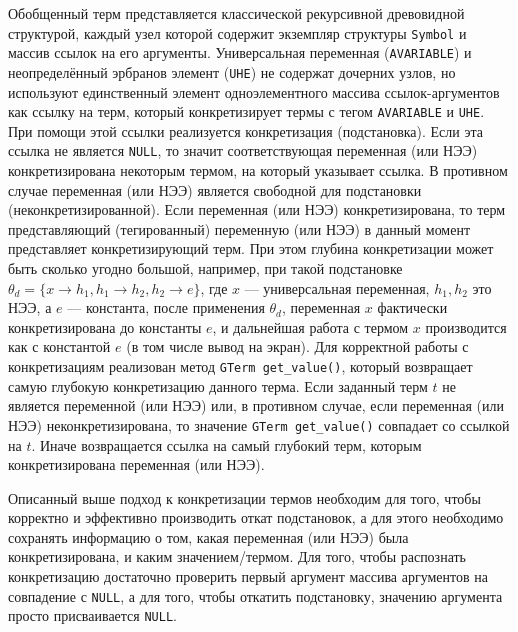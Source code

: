 Обобщенный терм представляется классической рекурсивной древовидной структурой, каждый узел которой содержит экземпляр структуры \texttt{Symbol} и массив ссылок на его аргументы. Универсальная переменная (\texttt{AVARIABLE}) и неопределённый эрбранов элемент (\texttt{UHE}) не содержат дочерних узлов, но используют единственный элемент одноэлементного массива ссылок-аргументов как ссылку на терм, который конкретизирует термы с тегом \texttt{AVARIABLE} и \texttt{UHE}. При помощи этой ссылки реализуется конкретизация (подстановка). Если эта ссылка не является \texttt{NULL}, то значит соответствующая переменная (или НЭЭ) конкретизирована некоторым термом, на который указывает ссылка. В противном случае переменная (или НЭЭ) является свободной для подстановки (неконкретизированной). Если переменная (или НЭЭ) конкретизирована, то терм представляющий (тегированный) переменную (или НЭЭ) в данный момент представляет конкретизирующий терм. При этом глубина конкретизации может быть сколько угодно большой, например, при такой подстановке ${\theta}_d = \{x \rightarrow h_1, h_1 \rightarrow h_2, h_2 \rightarrow e \}$, где $x$ --- универсальная переменная, $h_1, h_2$ это НЭЭ, а $e$ --- константа, после применения ${\theta}_d$, переменная $x$ фактически конкретизирована до константы $e$, и дальнейшая работа с термом $x$ производится как с константой $e$ (в том числе вывод на экран). Для корректной работы с конкретизациям реализован метод {\tt GTerm get\_value()}, который возвращает самую глубокую конкретизацию данного терма. Если заданный терм $t$ не является переменной (или НЭЭ) или, в противном случае, если переменная (или НЭЭ) неконкретизирована, то значение \texttt{GTerm get\_value()} совпадает со ссылкой на $t$. Иначе возвращается ссылка на самый глубокий терм, которым конкретизирована переменная (или НЭЭ).

Описанный выше подход к конкретизации термов необходим для того, чтобы корректно и эффективно производить откат подстановок, а для этого необходимо сохранять информацию о том, какая переменная (или НЭЭ) была конкретизирована, и каким значением/термом. Для того, чтобы распознать конкретизацию достаточно проверить первый аргумент массива аргументов на совпадение с \texttt{NULL}, а для того, чтобы откатить подстановку, значению аргумента просто присваивается \texttt{NULL}.

